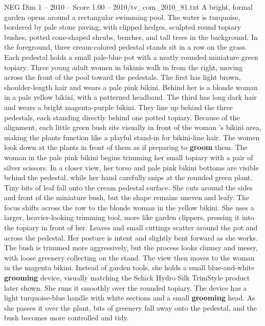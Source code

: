 \begin{textsample}{NEG Dim 1 – 2010 – Score 1.00 – 2010/tv\_com\_2010\_81.txt}  \label{ex:f1_neg_074}
A bright, formal garden opens around a rectangular swimming pool.
The water is turquoise, bordered by pale stone paving, with clipped hedges, sculpted round topiary bushes, potted cone-shaped shrubs, benches, and tall trees in the background.
In the foreground, three cream-colored pedestal stands sit in a row on the grass.
Each pedestal holds a small pale-blue pot with a neatly rounded miniature green topiary.
Three young adult women in bikinis walk in from the right, moving across the front of the pool toward the pedestals.
The first has light brown, shoulder-length hair and wears a pale pink bikini.
Behind her is a blonde woman in a pale yellow bikini, with a patterned headband.
The third has long dark hair and wears a bright magenta-purple bikini.
They line up behind the three pedestals, each standing directly behind one potted topiary.
Because of the alignment, each little green bush sits visually in front of the woman ’s bikini area, making the plants function like a playful stand-in for bikini-line hair.
The women look down at the plants in front of them as if preparing to \textbf{groom} them.
The woman in the pale pink bikini begins trimming her small topiary with a pair of silver scissors.
In a closer view, her torso and pale pink bikini bottoms are visible behind the pedestal, while her hand carefully snips at the rounded green plant.
Tiny bits of leaf fall onto the cream pedestal surface.
She cuts around the sides and front of the miniature bush, but the shape remains uneven and leafy.
The focus shifts across the row to the blonde woman in the yellow bikini.
She uses a larger, heavier-looking trimming tool, more like garden clippers, pressing it into the topiary in front of her.
Leaves and small cuttings scatter around the pot and across the pedestal.
Her posture is intent and slightly bent forward as she works.
The bush is trimmed more aggressively, but the process looks clumsy and messy, with loose greenery collecting on the stand.
The view then moves to the woman in the magenta bikini.
Instead of garden tools, she holds a small blue-and-white \textbf{grooming} device, visually matching the Schick Hydro Silk TrimStyle product later shown.
She runs it smoothly over the rounded topiary.
The device has a light turquoise-blue handle with white sections and a small \textbf{grooming} head.
As she passes it over the plant, bits of greenery fall away onto the pedestal, and the bush becomes more controlled and tidy.

\end{textsample}
